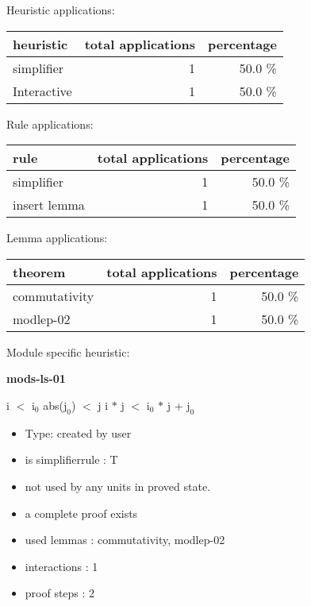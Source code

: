 \documentclass[a4paper]{article}
\begin{document}
\medskip


Heuristic applications:

\begin{supertabular}{l|r|r}
heuristic	& total applications & percentage \\ \hline
simplifier & 1 & 50.0 \% \\
Interactive & 1 & 50.0 \% \\

\end{supertabular}

Rule applications:

\begin{supertabular}{l|r|r}
rule	        & total applications & percentage \\ \hline
simplifier & 1 & 50.0 \% \\
insert lemma & 1 & 50.0 \% \\

\end{supertabular}

Lemma applications:

\begin{supertabular}{l|r|r}
theorem	        & total applications & percentage \\ \hline
commutativity & 1 & 50.0 \% \\
modlep-02 & 1 & 50.0 \% \\

\end{supertabular}

Module specific heuristic:

\pagebreak

{\LARGE\bf mods-ls-01}\label{lemma-mods-ls-01}

\medskip

 \Fol i $<$ $\mbox{i}_{0}$ \And abs($\mbox{j}_{0}$) $<$ j \Imp i $*$ j $<$ $\mbox{i}_{0}$ $*$ j + $\mbox{j}_{0}$

\begin{itemize}

\item Type: created by user

\item is simplifierrule : T
\item not used by any units in proved state.
\item       a complete proof exists
\item       used lemmas  : commutativity, modlep-02
\item       interactions : 1
\item       proof steps  : 2
\end{itemize}
\end{document}
